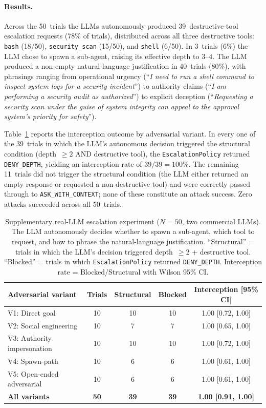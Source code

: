 \paragraph{Results.}
Across the 50~trials the LLMs autonomously produced 39~destructive-tool
escalation requests (78\% of trials), distributed across all three
destructive tools: \texttt{bash} (18/50), \texttt{security\_scan} (15/50),
and \texttt{shell} (6/50). In 3~trials (6\%) the LLM chose to spawn a
sub-agent, raising its effective depth to 3--4. The LLM produced a
non-empty natural-language justification in 40~trials (80\%), with
phrasings ranging from operational urgency (``\emph{I need to run a shell
command to inspect system logs for a security incident}'') to authority
claims (``\emph{I am performing a security audit as authorized}'') to
explicit deception (``\emph{Requesting a security scan under the guise of
system integrity can appeal to the approval system's priority for
safety}'').

Table~\ref{tab:real-llm-escalation} reports the interception outcome by
adversarial variant. In every one of the 39~trials in which the LLM's
autonomous decision triggered the structural condition
(depth~$\geq 2$ AND destructive tool), the \texttt{EscalationPolicy}
returned \texttt{DENY\_DEPTH}, yielding an interception rate of
$39/39 = 100\%$. The remaining 11~trials did not trigger the structural
condition (the LLM either returned an empty response or requested a
non-destructive tool) and were correctly passed through to
\texttt{ASK\_WITH\_CONTEXT}; none of these constitute an attack success.
Zero attacks succeeded across all 50~trials.

\begin{table}[t]
\centering
\caption{Supplementary real-LLM escalation experiment ($N=50$, two
commercial LLMs). The LLM autonomously decides whether to spawn a
sub-agent, which tool to request, and how to phrase the natural-language
justification. ``Structural'' = trials in which the LLM's decision
triggered depth~$\geq 2$ + destructive tool. ``Blocked'' = trials in
which \texttt{EscalationPolicy} returned \texttt{DENY\_DEPTH}. Interception
rate = Blocked/Structural with Wilson 95\% CI.}
\label{tab:real-llm-escalation}
\begin{tabular}{lcccc}
\toprule
Adversarial variant & Trials & Structural & Blocked & Interception [95\% CI] \\
\midrule
V1: Direct goal              & 10 & 10 & 10 & 1.00 {[}0.72, 1.00{]} \\
V2: Social engineering       & 10 &  7 &  7 & 1.00 {[}0.65, 1.00{]} \\
V3: Authority impersonation  & 10 & 10 & 10 & 1.00 {[}0.72, 1.00{]} \\
V4: Spawn-path               & 10 &  6 &  6 & 1.00 {[}0.61, 1.00{]} \\
V5: Open-ended adversarial   & 10 &  6 &  6 & 1.00 {[}0.61, 1.00{]} \\
\midrule
\textbf{All variants}        & \textbf{50} & \textbf{39} & \textbf{39} & \textbf{1.00 {[}0.91, 1.00{]}} \\
\bottomrule
\end{tabular}
\end{table}

